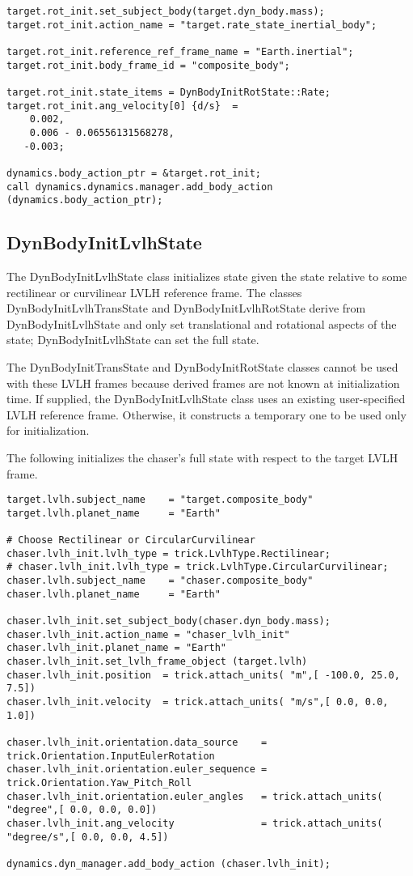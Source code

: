 \begin{verbatim}
target.rot_init.set_subject_body(target.dyn_body.mass);
target.rot_init.action_name = "target.rate_state_inertial_body";

target.rot_init.reference_ref_frame_name = "Earth.inertial";
target.rot_init.body_frame_id = "composite_body";

target.rot_init.state_items = DynBodyInitRotState::Rate;
target.rot_init.ang_velocity[0] {d/s}  =
    0.002,
    0.006 - 0.06556131568278,
   -0.003;

dynamics.body_action_ptr = &target.rot_init;
call dynamics.dynamics.manager.add_body_action (dynamics.body_action_ptr);
\end{verbatim}


\subsection{DynBodyInitLvlhState}
The DynBodyInitLvlhState class initializes state
given the state relative to some rectilinear or curvilinear LVLH
reference frame. The classes DynBodyInitLvlhTransState and
DynBodyInitLvlhRotState derive from DynBodyInitLvlhState and only set
translational and rotational aspects of the state; DynBodyInitLvlhState
can set the full state.

The DynBodyInitTransState and DynBodyInitRotState classes cannot
be used with these LVLH frames because derived frames
are not known at initialization time. If supplied, the DynBodyInitLvlhState class
uses an existing user-specified LVLH reference frame. Otherwise, it constructs
a temporary one to be used only for initialization.

The following initializes the chaser's full state with respect to the
target LVLH frame.

\begin{verbatim}
target.lvlh.subject_name    = "target.composite_body"
target.lvlh.planet_name     = "Earth"

# Choose Rectilinear or CircularCurvilinear
chaser.lvlh_init.lvlh_type = trick.LvlhType.Rectilinear;
# chaser.lvlh_init.lvlh_type = trick.LvlhType.CircularCurvilinear;
chaser.lvlh.subject_name    = "chaser.composite_body"
chaser.lvlh.planet_name     = "Earth"

chaser.lvlh_init.set_subject_body(chaser.dyn_body.mass);
chaser.lvlh_init.action_name = "chaser_lvlh_init"
chaser.lvlh_init.planet_name = "Earth"
chaser.lvlh_init.set_lvlh_frame_object (target.lvlh)
chaser.lvlh_init.position  = trick.attach_units( "m",[ -100.0, 25.0, 7.5])
chaser.lvlh_init.velocity  = trick.attach_units( "m/s",[ 0.0, 0.0, 1.0])

chaser.lvlh_init.orientation.data_source    = trick.Orientation.InputEulerRotation
chaser.lvlh_init.orientation.euler_sequence = trick.Orientation.Yaw_Pitch_Roll
chaser.lvlh_init.orientation.euler_angles   = trick.attach_units( "degree",[ 0.0, 0.0, 0.0])
chaser.lvlh_init.ang_velocity               = trick.attach_units( "degree/s",[ 0.0, 0.0, 4.5])

dynamics.dyn_manager.add_body_action (chaser.lvlh_init);
\end{verbatim}


